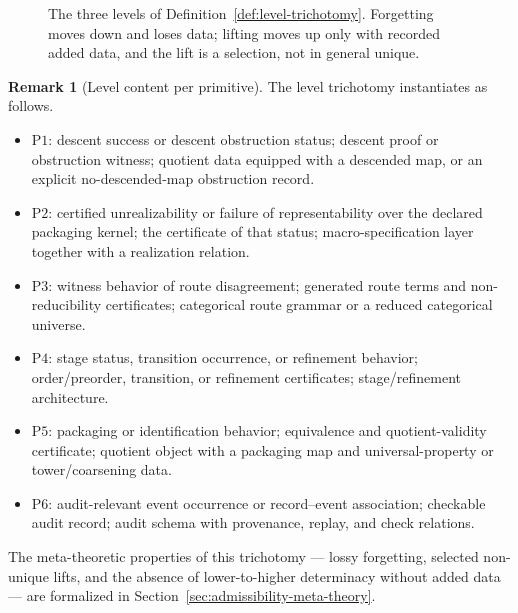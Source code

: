 \documentclass[11pt]{article}
\theoremstyle{definition}
\newtheorem{remark}[theorem]{Remark}
\newcommand{\Pone}{\ensuremath{\mathrm{P1}}}
\newcommand{\Ptwo}{\ensuremath{\mathrm{P2}}}
\newcommand{\Pthree}{\ensuremath{\mathrm{P3}}}
\newcommand{\Pfour}{\ensuremath{\mathrm{P4}}}
\newcommand{\Pfive}{\ensuremath{\mathrm{P5}}}
\newcommand{\Psix}{\ensuremath{\mathrm{P6}}}
\begin{document}
\begin{figure}[htbp]
\centering
{}
\caption{The three levels of Definition~\ref{def:level-trichotomy}. Forgetting
moves down and loses data; lifting moves up only with recorded added data, and
the lift is a selection, not in general unique.}\label{fig:levels}
\end{figure}

\begin{remark}[Level content per primitive]\label{rem:per-primitive-levels}
The level trichotomy instantiates as follows.
\begin{itemize}[topsep=2pt,itemsep=1pt]
  \item \Pone{}: descent success or descent obstruction status; descent
    proof or obstruction witness; quotient data equipped with a descended
    map, or an explicit no-descended-map obstruction record.
  \item \Ptwo{}: certified unrealizability or failure of representability
    over the declared packaging kernel; the certificate of that status;
    macro-specification layer together with a realization relation.
  \item \Pthree{}: witness behavior of route disagreement; generated route
    terms and non-reducibility certificates; categorical route grammar or a
    reduced categorical universe.
  \item \Pfour{}: stage status, transition occurrence, or refinement
    behavior; order/preorder, transition, or refinement certificates;
    stage/refinement architecture.
  \item \Pfive{}: packaging or identification behavior; equivalence and
    quotient-validity certificate; quotient object with a packaging map
    and universal-property or tower/coarsening data.
  \item \Psix{}: audit-relevant event occurrence or record--event
    association; checkable audit record; audit schema with provenance,
    replay, and check relations.
\end{itemize}
The meta-theoretic properties of this trichotomy --- lossy forgetting,
selected non-unique lifts, and the absence of lower-to-higher determinacy
without added data --- are formalized in
Section~\ref{sec:admissibility-meta-theory}.
\end{remark}
\end{document}
